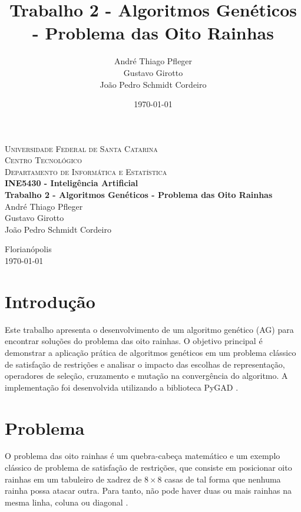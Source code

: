 \documentclass[a4paper,12pt]{article}
\title{Trabalho 2 - Algoritmos Genéticos - Problema das Oito Rainhas}
\author{André Thiago Pfleger \\  Gustavo Girotto \\ João Pedro Schmidt Cordeiro}
\date{\today}
\begin{document}
\begin{titlepage}
   \begin{center}
      \textsc{Universidade Federal de Santa Catarina} \\
      \textsc{Centro Tecnológico} \\
      \textsc{Departamento de Informática e Estatística} \\[4cm]

      \textbf{\Large{INE5430 - Inteligência Artificial}} \\[2cm]

      \textbf{\huge{Trabalho 2 - Algoritmos Genéticos - Problema das Oito Rainhas}} \\[3cm]

      André Thiago Pfleger \\
      Gustavo Girotto \\
      João Pedro Schmidt Cordeiro \\
      
      \vfill
      
      {Florianópolis} \\
      {\today}
   \end{center}
\end{titlepage}

\section{Introdução}
\label{ch:introducao}

Este trabalho apresenta o desenvolvimento de um algoritmo genético (AG) para encontrar soluções do problema das oito rainhas. O objetivo principal é demonstrar a aplicação prática de algoritmos genéticos em um problema clássico de satisfação de restrições e analisar o impacto das escolhas de representação, operadores de seleção, cruzamento e mutação na convergência do algoritmo. A implementação foi desenvolvida utilizando a biblioteca PyGAD \cite{pygad}.

\section{Problema}
\label{ch:problema}

O problema das oito rainhas é um quebra-cabeça matemático e um exemplo clássico de problema de satisfação de restrições, que consiste em posicionar oito rainhas em um tabuleiro de xadrez de \(8\times 8\) casas de tal forma que nenhuma rainha possa atacar outra. Para tanto, não pode haver duas ou mais rainhas na mesma linha, coluna ou diagonal \cite{wiki:8queens}.
\end{document}
